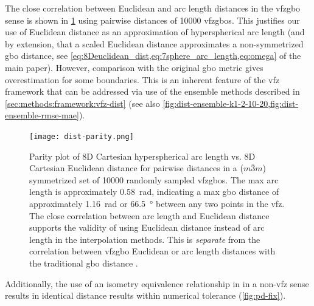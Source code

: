 \documentclass[preprint,12pt]{elsarticle}
\begin{document}
The close correlation between Euclidean and arc length distances in the \gls{vfzgbo} sense is shown in \cref{fig:dist-parity} using pairwise distances of \num{10000} \glspl{vfzgbo}. This justifies our use of Euclidean distance as an approximation of hyperspherical arc length (and by extension, that a scaled Euclidean distance approximates a non-symmetrized \gls{gbo} distance, see \cref{eq:8Deuclidean_dist,eq:7sphere_arc_length,eq:omega} of the main paper). However, comparison with the original \gls{gbo} metric \cite{francisGeodesicOctonionMetric2019} gives overestimation for some boundaries. This is an inherent feature of the \gls{vfz} framework that can be addressed via use of the ensemble methods described in \cref{sec:methods:framework:vfz-dist} (see also \cref{fig:dist-ensemble-k1-2-10-20,fig:dist-ensemble-rmse-mae}).

\begin{figure}
\centering
\texttt{[image: dist-parity.png]}
\caption{Parity plot of 8D Cartesian hyperspherical arc length vs. 8D Cartesian Euclidean distance for pairwise distances in a ($m\bar{3}m$) symmetrized set of \num{10000} randomly sampled \glspl{vfzgbo}. The max arc length is approximately \SI{0.58}{\radian}, indicating a max \gls{gbo} distance of approximately \SI{1.16}{\radian} or \SI{66.5}{\degree} between any two points in the \gls{vfz}. The close correlation between arc length and Euclidean distance supports the validity of using Euclidean distance instead of arc length in the interpolation methods. This is \textit{separate} from the correlation between \gls{vfzgbo} Euclidean or arc length distances with the traditional \gls{gbo} distance \cite{chesserLearningGrainBoundary2020}.}
\label{fig:dist-parity}
\end{figure}

Additionally, the use of an isometry equivalence relationship in \citet{morawiecDistancesGrainInterfaces2019} in a non-\gls{vfz} sense results in identical distance results within numerical tolerance (\cref{fig:pd-fix}).
\end{document}
